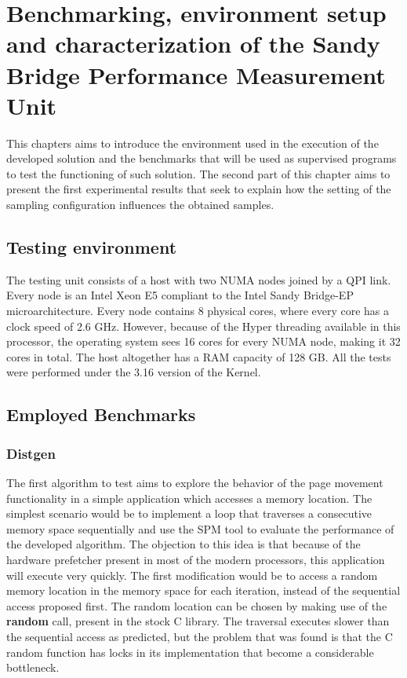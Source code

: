 \chapter[Benchmarking, environment setup and characterization of the Performance Measurement Unit]{Benchmarking, environment setup and characterization of the Sandy Bridge Performance Measurement Unit}\label{chapter:envsetup}

This chapters aims to introduce the environment used in the execution of the developed solution and the benchmarks that will be used as supervised programs to test the functioning of such solution. The second part of this chapter aims to present the first experimental results that seek to explain how the setting of the sampling configuration influences the obtained samples.

\section{Testing environment}\label{section:runningenv}
The testing unit consists of a host with two NUMA nodes joined by a QPI link. Every node is an Intel Xeon E5 compliant to the Intel Sandy Bridge-EP microarchitecture. Every node contains 8 physical cores, where every core has a clock speed of 2.6 GHz. However, because of the Hyper threading available in this processor, the operating system sees 16 cores for every NUMA node, making it 32 cores in total. The host altogether has a RAM capacity of 128 GB. All the tests were performed under the 3.16 version of the Kernel.

\section{Employed Benchmarks}\label{section:emplybmchs}

\subsection{Distgen}\label{section:distgen}
The first algorithm to test aims to explore the behavior of the page movement functionality in a simple application which accesses a memory location. The simplest scenario would be to implement a loop that traverses a consecutive memory space sequentially and use the SPM tool to evaluate the performance of the developed algorithm. The objection to this idea is that because of the hardware prefetcher present in most of the modern processors, this application will execute very quickly. The first modification would be to access a random memory location in the memory space for each iteration, instead of the sequential access proposed first. The random location can be chosen by making use of the \textbf{random} call, present in the stock C library. The traversal executes slower than the sequential access as predicted, but the problem that was found is that the C random function has locks in its implementation that become a considerable bottleneck.

